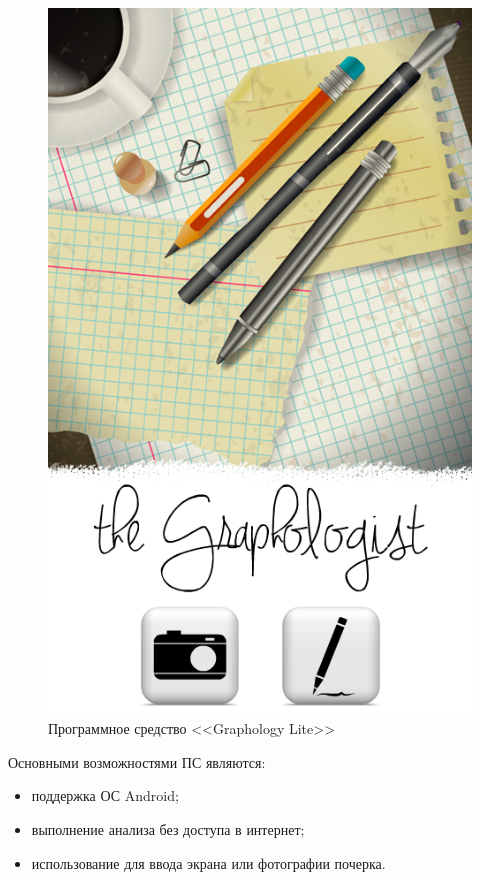 \begin{figure}[h]
    \centering
    \includegraphics[height=0.5\textheight]{figures/analog_graphology_lite.png}
    \caption{Программное средство <<Graphology Lite>>}
    \label{fig:domain:analogs:graphology_lite}
\end{figure}

Основными возможностями ПС являются:
\begin{itemize}
  \item поддержка ОС Android;
  \item выполнение анализа без доступа в интернет;
  \item использование для ввода экрана или фотографии почерка.
\end{itemize}

